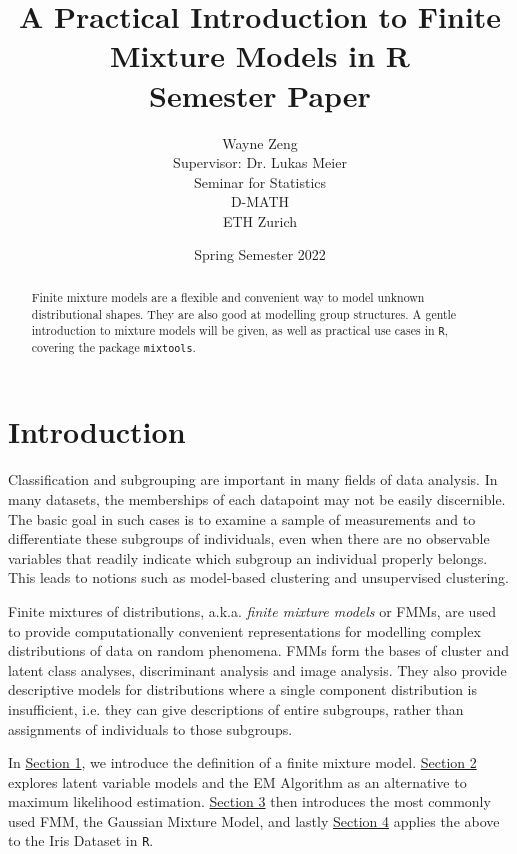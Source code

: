 \documentclass{article}\usepackage[]{graphicx}\usepackage[]{xcolor}
\title{\textbf{A Practical Introduction to Finite Mixture Models in R} \\ [.6cm] \normalsize Semester Paper}
\author{Wayne Zeng\\[.6cm]{Supervisor: Dr. Lukas Meier} \\[2cm] \normalsize Seminar for Statistics \\ \normalsize D-MATH \\ \normalsize ETH Zurich}
\date{\normalsize Spring Semester 2022}
\theoremstyle{plain}
\theoremstyle{definition}
\theoremstyle{remark}
\begin{document}
\maketitle
\vspace{2em}
\begin{abstract}
Finite mixture models are a flexible and convenient way to model unknown distributional shapes. They are also good at modelling group structures. A gentle introduction to mixture models will be given, as well as practical use cases in \texttt{R}, covering the package \texttt{mixtools}.
\end{abstract}

\newpage

{
  \hypersetup{linkcolor=blue}
  \tableofcontents
}

\newpage


\section*{Introduction}

Classification and subgrouping are important in many fields of data analysis. In many datasets, the memberships of each datapoint may not be easily discernible. The basic goal in such cases is to examine a sample of measurements and to differentiate these subgroups of individuals, even when there are no observable variables that readily indicate which subgroup an individual properly belongs. This leads to notions such as model-based clustering and unsupervised clustering.

Finite mixtures of distributions, a.k.a. \textit{finite mixture models} or FMMs, are used to provide computationally convenient representations for modelling complex distributions of data on random phenomena. FMMs form the bases of cluster and latent class analyses, discriminant analysis and image analysis. They also provide descriptive models for distributions where a single component distribution is insufficient, i.e. they can give descriptions of entire subgroups, rather than assignments of individuals to those subgroups.

In \hyperref[sec:formulation]{Section 1}, we introduce the definition of a finite mixture model. \hyperref[sec:EM]{Section 2} explores latent variable models and the EM Algorithm as an alternative to maximum likelihood estimation. \hyperref[sec:GMM]{Section 3} then introduces the most commonly used FMM, the Gaussian Mixture Model, and lastly \hyperref[sec:Iris]{Section 4} applies the above to the Iris Dataset in \texttt{R}.
\end{document}
